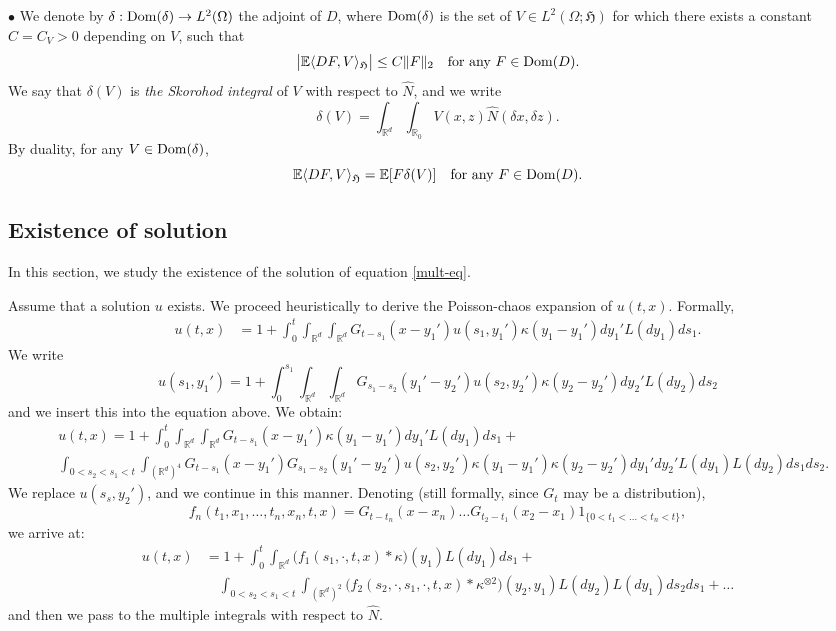 \documentclass[12pt]{article}
\def\bE{\mathbb{E}}
\def\bR{\mathbb{R}}
\newcommand{\fH}{\mathfrak{H}}
\def\k{\kappa}
\begin{document}
$\bullet$
We denote by $\delta:{\rm Dom}(\delta)\to L^2(\Omega) $ the adjoint of $D$, where ${\rm Dom}(\delta)$ is the set of $V \in L^2(\Omega;\fH)$ for which there exists a constant $C=C_V>0$ depending on $V$, such that 
\[
\big|\bE \langle DF,V \rangle_{\fH}\big| \leq C \|F\|_2 \quad \mbox{for any $F \in {\rm Dom}(D)$}.
\] 
We say that $\delta(V)$ is 
{\em the Skorohod integral} of $V$ with respect to $\widehat{N}$, and we write
\[
\delta(V)=\int_{ \bR^d } \int_{\bR_0}V(x,z)\widehat{N}(\delta x, \delta z).
\]
By duality, for any $V \in {\rm Dom}(\delta)$,
\[
\bE\langle DF,V \rangle_{\fH}=\bE[F \delta(V)] \quad \mbox{for any $F \in {\rm Dom}(D)$}.
\]


\subsection{Existence of solution}


In this section, we study the existence of the solution of equation \eqref{mult-eq}.

\medskip


Assume that a solution $u$ exists. We proceed heuristically to derive the Poisson-chaos expansion of $u(t,x)$.
Formally,
\begin{align*}
u(t,x)&=1+\int_0^t \int_{\bR^d} \int_{\bR^d}G_{t-s_1}(x-y_1')u(s_1,y_1')\k(y_1-y_1')dy_1' L(dy_1)ds_1.
\end{align*}
We write
\[
u(s_1,y_1')=1+\int_0^{s_1} \int_{\bR^d}\int_{\bR^d} G_{s_1-s_2}(y_1'-y_2')u(s_2,y_2')\k(y_2-y_2')dy_2'L(dy_2)ds_2
\]
and we insert this into the equation above. We obtain:
\begin{align*}
& u(t,x)=1+\int_0^t \int_{\bR^d} \int_{\bR^d}G_{t-s_1}(x-y_1')\k(y_1-y_1')dy_1' L(dy_1)ds_1+\\
&\int_{0<s_2<s_1<t} \int_{(\bR^d)^4} G_{t-s_1}(x-y_1')G_{s_1-s_2}(y_1'-y_2') u(s_2,y_2') \k(y_1-y_1') \k(y_2-y_2') dy_1' dy_2'L(dy_1) L(dy_2)ds_1 ds_2.
\end{align*}
We replace $u(s_s,y_2')$, and we continue in this manner.
Denoting (still formally, since $G_t$ may be a distribution),
\[
f_n(t_1,x_1,\ldots,t_n,x_n,t,x)=G_{t-t_n}(x-x_n)\ldots G_{t_2-t_1}(x_2-x_1) 1_{\{0<t_1<\ldots<t_n<t\}},
\]
we arrive at:
\begin{align*}
u(t,x)&=1+\int_0^t \int_{\bR^d}\big(f_1(s_1,\cdot,t,x)*\k\big)(y_1)L(dy_1)ds_1+\\
& \quad \int_{0<s_2<s_1<t}  \int_{(\bR^d)^2}\big(f_2(s_2,\cdot,s_1,\cdot,t,x)*\k^{\otimes 2}\big)(y_2,y_1) L(dy_2)L(dy_1) ds_2 ds_1+\ldots
\end{align*}
and then we pass to the multiple integrals with respect to $\widehat{N}$.
\end{document}
